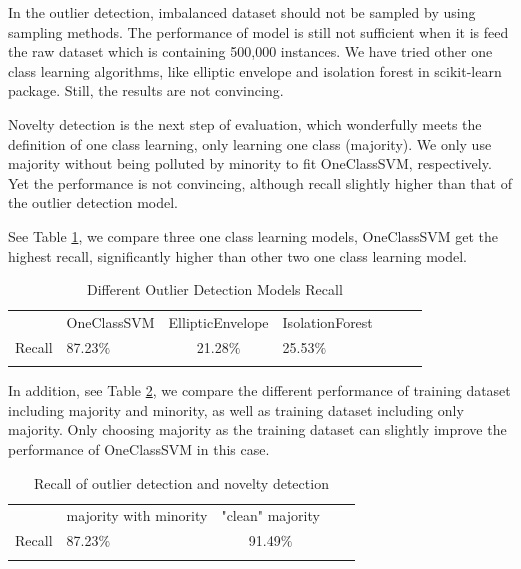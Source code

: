 In the outlier detection, imbalanced dataset should not be sampled by using sampling methods. The performance of model is still not sufficient when it is feed the raw dataset which is containing 500,000 instances. We have tried other one class learning algorithms, like elliptic envelope and isolation forest in scikit-learn package. Still, the results are not convincing.

Novelty detection is the next step of evaluation, which wonderfully meets the definition of one class learning, only learning one class (majority). We only use majority without being polluted by minority to fit OneClassSVM, respectively. Yet the performance is not convincing, although recall slightly higher than that of the outlier detection model.

See Table \ref{tab:differ_outlier_detec}, we compare three one class learning models, OneClassSVM get the highest recall, significantly higher than other two one class learning model.

\begin{table}[h]
\caption{Different Outlier Detection Models Recall}
\label{tab:differ_outlier_detec}       %
\begin{tabular}{clclclc}
\hline\noalign{\smallskip}
 & OneClassSVM & EllipticEnvelope & IsolationForest  \\
\noalign{\smallskip}\hline\noalign{\smallskip}
Recall & 87.23$\%$ & 21.28$\%$ & 25.53$\%$ \\
\noalign{\smallskip}\hline
\end{tabular}
\end{table}


In addition, see Table \ref{tab:novelty}, we compare the different performance of training dataset including majority and minority, as well as training dataset including only majority. Only choosing majority as the training dataset  can slightly improve the performance of OneClassSVM in this case.

\begin{table}[h]
\caption{Recall of outlier detection and novelty detection}
\label{tab:novelty}       %
\begin{tabular}{clclc}
\hline\noalign{\smallskip}
 & majority with minority & "clean" majority  \\
\noalign{\smallskip}\hline\noalign{\smallskip}
Recall & 87.23$\%$ & 91.49$\%$ \\
\noalign{\smallskip}\hline
\end{tabular}
\end{table}

